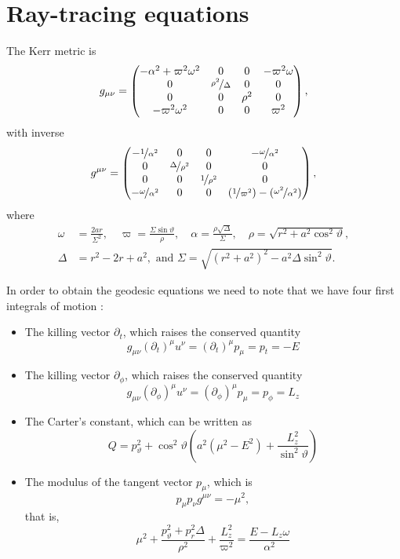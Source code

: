 \chapter{Ray-tracing equations}

The Kerr metric is
\[
	g_{\mu\nu} = \begin{pmatrix}
		-\alpha^2 + \varpi^2\omega^2 & 0 & 0 & -\varpi^2\omega \\
		0 & \nicefrac{\rho^2}{\Delta} & 0 & 0 \\
		0 & 0 & \rho^2 & 0 \\
		-\varpi^2\omega^2 & 0 & 0 & \varpi^2
	\end{pmatrix},
\]
with inverse
\[
	g^{\mu\nu} = \begin{pmatrix}
		-\nicefrac{1}{\alpha^2} & 0 & 0 & -\nicefrac{\omega}{\alpha^2} \\
		0 & \nicefrac{\Delta}{\rho^2} & 0 & 0 \\
		0 & 0 & \nicefrac{1}{\rho^2} & 0 \\
		-\nicefrac{\omega}{\alpha^2} & 0 & 0 & (\nicefrac{1}{\varpi^2}) - (\nicefrac{\omega^2}{\alpha^2})
	\end{pmatrix},
\]
where
\begin{align*}
	\omega &= \frac{2ar}{\Sigma^2},  \quad \varpi = \frac{\Sigma\sin\vartheta}{\rho}, \quad \alpha = \frac{\rho\sqrt{\Delta}}{\Sigma}, \quad \rho = \sqrt{r^2 + a^2\cos^2\vartheta},\\
	\Delta &= r^2 - 2r + a^2, \textrm{ and } \Sigma = \sqrt{(r^2+a^2)^2 - a^2\Delta\sin^2\vartheta}.
\end{align*}

In order to obtain the geodesic equations we need to note that we have four first integrals of motion :
\begin{itemize}
	\item The killing vector  $\partial_t$, which raises the conserved quantity
	\[
		g_{\mu\nu}(\partial_t)^\mu u^\nu = (\partial_t)^\mu p_\mu = p_t = -E
	\]
	\item The killing vector $\partial_\phi$, which raises the conserved quantity
	\[
		g_{\mu\nu}(\partial_\phi)^\mu u^\nu = (\partial_\phi)^\mu p_\mu = p_\phi = L_z
	\]
	\item The Carter's constant, which can be written as
	\begin{equation}
		\label{eq:carter}
		Q = p_\vartheta^2 + \cos^2\vartheta \left( a^2 \left( \mu^2 - E^2 \right) + \frac{L_z^2}{\sin^2\vartheta} \right)
	\end{equation}
	\item The modulus of the tangent vector $p_\mu$, which is
	\begin{equation}
		\label{eq:modulus}
		p_\mu p_\nu g^{\mu\nu} = -\mu^2,
	\end{equation}
	that is,
	\[
		\mu^2 + \frac{p_\vartheta^2 + p_r^2 \Delta}{\rho^2} + \frac{L_z^2}{\varpi^2} = \frac{E - L_z \omega}{\alpha^2}
	\]
\end{itemize}

